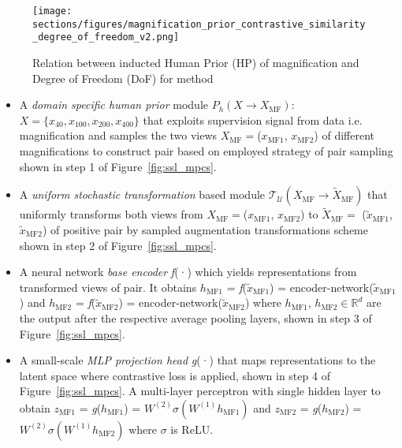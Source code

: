 \documentclass[conference]{IEEEtran}
\begin{document}
\begin{figure}[!ht]
    \centering
    \texttt{[image: sections/figures/magnification\_prior\_contrastive\_similarity\_degree\_of\_freedom\_v2.png]}
    \vspace{-0.2cm}
    \caption{Relation between inducted Human Prior (HP) of magnification and Degree of Freedom (DoF) for method}
    \label{fig:degrre_of_freedom}
    \vspace{-4mm}
\end{figure}
\begin{itemize}
    \item A \textit{domain specific human prior} module $P_h(X \to X_\mathrm{MF})$: $X=\{x_{40}, x_{100}, x_{200}, x_{400}\}$ that exploits supervision signal from data i.e. magnification and samples the two views $X_\mathrm{MF}=$(\textbf{$x_\mathrm{MF1}$}, \textbf{$x_\mathrm{MF2}$}) of different magnifications to construct pair based on employed strategy of pair sampling shown in step 1 of Figure~\ref{fig:ssl_mpcs}. \vspace{-0.2cm}
    \item A \textit{uniform stochastic transformation} based module $\displaystyle \mathcal{T_U}(X_\mathrm{MF} \to \tilde{X}_\mathrm{MF})$ that uniformly transforms both views from $X_\mathrm{MF}=$(\textbf{$x_\mathrm{MF1}$}, \textbf{$x_\mathrm{MF2}$}) to $\tilde{X}_\mathrm{MF}=$ (\textbf{$\tilde{x}_\mathrm{MF1}$}, \textbf{$\tilde{x}_\mathrm{MF2}$}) of positive pair by sampled augmentation transformations scheme shown in step 2 of Figure~\ref{fig:ssl_mpcs}.\vspace{-0.2cm}
\item  A neural network \textit{base encoder} \textit{f}(·) which yields representations from transformed views of pair. It obtains $h_\mathrm{MF1}$ = \textit{f}($\tilde{x}_\mathrm{MF1}$) = encoder-network($\tilde{x}_\mathrm{MF1}$) and $h_\mathrm{MF2}$ = \textit{f}($\tilde{x}_\mathrm{MF2}$) = encoder-network($\tilde{x}_\mathrm{MF2}$) where $h_\mathrm{MF1}$, $h_\mathrm{MF2} \in \mathbb{R}^d$ are the output after the respective average pooling layers, shown in step 3 of Figure~\ref{fig:ssl_mpcs}.\vspace{-0.2cm}
    \item A small-scale \textit{MLP projection head} \textit{g}(·) that maps representations to the latent space where contrastive loss is applied, shown in step 4 of Figure~\ref{fig:ssl_mpcs}.
    A multi-layer perceptron with single hidden layer to obtain $z_\mathrm{MF1}$ = \textit{g}($h_\mathrm{MF1}$) = $W^{(2)}\sigma(W^{(1)}{h_\mathrm{MF1}})$ and $z_\mathrm{MF2}$ = \textit{g}($h_\mathrm{MF2}$) = $W^{(2)}\sigma(W^{(1)}{h_\mathrm{MF2}})$ where $\sigma$ is ReLU.\vspace{-0.2cm}

\end{itemize}
\end{document}
